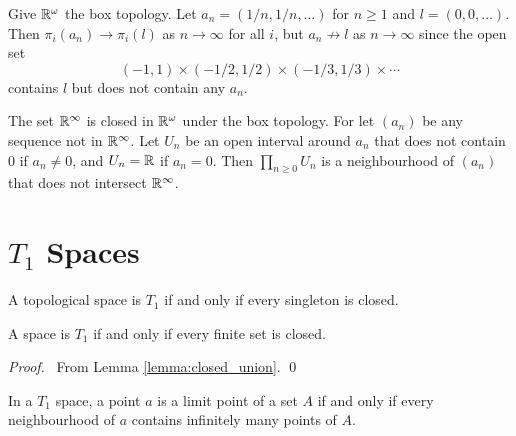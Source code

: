\begin{example}
    Give $\mathbb{R}^\omega$ the box topology. Let $a_n = (1/n, 1/n, \ldots)$ for $n \geq 1$ and $l = (0, 0, \ldots)$. Then $\pi_i(a_n) \rightarrow \pi_i(l)$
    as $n \rightarrow \infty$ for all $i$, but $a_n \not\rightarrow l$ as $n \rightarrow \infty$ since the open set
    \[ (-1,1) \times (-1/2, 1/2) \times (-1/3,1/3) \times \cdots \]
    contains $l$ but does not contain any $a_n$.
\end{example}

\begin{example}
    The set $\mathbb{R}^\infty$ is closed in $\mathbb{R}^\omega$ under the box topology. For let $(a_n)$ be any sequence not in $\mathbb{R}^\infty$.
    Let $U_n$ be an open interval around $a_n$ that does not contain $0$ if $a_n \neq 0$, and $U_n = \mathbb{R}$ if $a_n = 0$.
    Then $\prod_{n \geq 0} U_n$ is a neighbourhood of $(a_n)$ that does not intersect $\mathbb{R}^\infty$.
\end{example}

\section{$T_1$ Spaces}

\begin{definition}[$T_1$ Space]
    A topological space is $T_1$ if and only if every singleton is closed.
\end{definition}

\begin{lemma}
    A space is $T_1$ if and only if every finite set is closed.
\end{lemma}

\begin{proof}
    \pf\ From Lemma \ref{lemma:closed_union}. \qed
\end{proof}

\begin{theorem}
    In a $T_1$ space, a point $a$ is a limit point of a set $A$ if and only if every neighbourhood of $a$
    contains infinitely many points of $A$.
\end{theorem}

